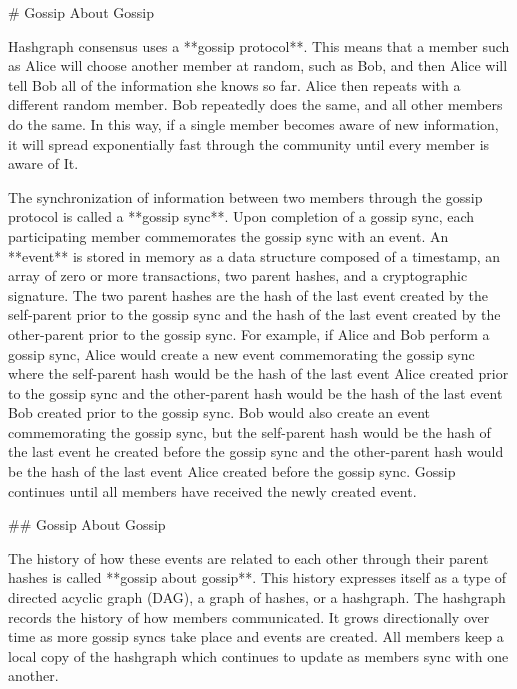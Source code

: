 # Gossip About Gossip

Hashgraph consensus uses a **gossip protocol**. This means that a member such as Alice will choose another member at random, such as Bob, and then Alice will tell Bob all of the information she knows so far. Alice then repeats with a different random member. Bob repeatedly does the same, and all other members do the same. In this way, if a single member becomes aware of new information, it will spread exponentially fast through the community until every member is aware of It.

The synchronization of information between two members through the gossip protocol is called a **gossip sync**. Upon completion of a gossip sync, each participating member commemorates the gossip sync with an event. An **event** is stored in memory as a data structure composed of a timestamp, an array of zero or more transactions, two parent hashes, and a cryptographic signature. The two parent hashes are the hash of the last event created by the self-parent prior to the gossip sync and the hash of the last event created by the other-parent prior to the gossip sync. For example, if Alice and Bob perform a gossip sync, Alice would create a new event commemorating the gossip sync where the self-parent hash would be the hash of the last event Alice created prior to the gossip sync and the other-parent hash would be the hash of the last event Bob created prior to the gossip sync. Bob would also create an event commemorating the gossip sync, but the self-parent hash would be the hash of the last event he created before the gossip sync and the other-parent hash would be the hash of the last event Alice created before the gossip sync. Gossip continues until all members have received the newly created event.

## Gossip About Gossip

The history of how these events are related to each other through their parent hashes is called **gossip about gossip**. This history expresses itself as a type of directed acyclic graph (DAG), a graph of hashes, or a hashgraph. The hashgraph records the history of how members communicated. It grows directionally over time as more gossip syncs take place and events are created. All members keep a local copy of the hashgraph which continues to update as members sync with one another.

